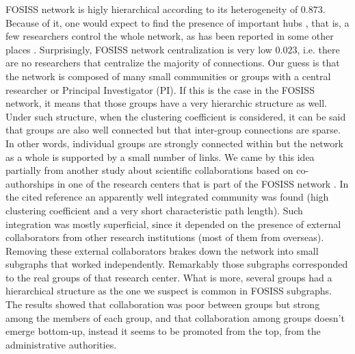 \documentclass{bmcart}
\begin{document}
  FOSISS network is higly hierarchical according to its
  heterogeneity of $0.873$. Because of it, one would expect to find
  the presence of important hubs \cite{Wu:2008}, that is, a few
  researchers control the whole network, as has been reported in some
  other places \cite{yousefi-etal:2008}. Surprisingly, FOSISS network
  centralization is very low $0.023$, i.e. there are no researchers
  that centralize the majority of connections. Our guess is that the
  network is composed of many small communities or groups with a
  central researcher or Principal Investigator (PI). If this is the
  case in the FOSISS network, it means that those groups have a very
  hierarchic structure as well.\\

  Under such structure, when the clustering coefficient is
  considered, it can be said that groups are also well connected but
  that inter-group connections are sparse. In other words, individual
  groups are strongly connected within but the network as a whole is
  supported by a small number of links. We came by this idea partially
  from another study about scientific collaborations based on
  co-authorships in one of the research centers that is part of the
  FOSISS network \cite{HernandezLemus:2013}. In the cited reference an
  apparently well integrated community was found (high clustering
  coefficient and a very short characteristic path length). Such
  integration was mostly superficial, since it depended on the
  presence of external collaborators from other research institutions
  (most of them from overseas).  Removing these external collaborators
  brakes down the network into small subgraphs that worked
  independently. Remarkably those subgraphs corresponded to the real
  groups of that research center.  What is more, several groups had a
  hierarchical structure as the one we suspect is common in FOSISS
  subgraphs. The results showed that collaboration was poor between
  groups but strong among the members of each group, and that
  collaboration among groups doesn't emerge bottom-up, instead it
  seems to be promoted from the top, from the administrative
  authorities.\\
\end{document}
